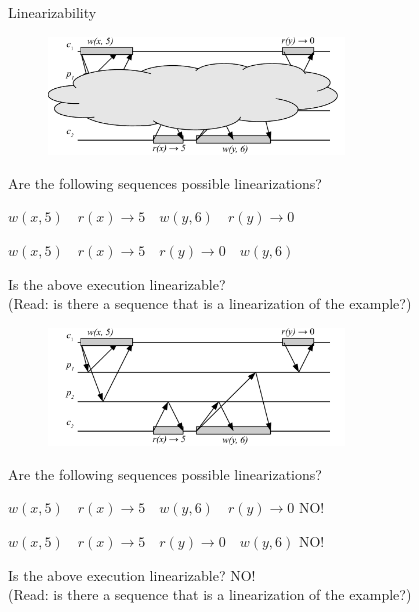 \begin{frame}{Linearizability}

\begin{overprint}

\begin{figure}
\includegraphics[width=0.7\textwidth]{lin-01}
\end{figure}

\begin{example}
\BI
\item Are the following sequences possible linearizations?
\BI
\item $w(x,5) \quad r(x) \rightarrow 5 \quad w(y,6) \quad r(y) \rightarrow 0$
\item $w(x,5) \quad r(x) \rightarrow 5 \quad r(y) \rightarrow 0 \quad w(y,6)$
\EI
\item Is the above execution linearizable?\\ (Read: is there a sequence that is a linearization of the example?)
\EI
\end{example}

\begin{figure}
\includegraphics[width=0.7\textwidth]{lin-01n}
\end{figure}

\begin{example}
\BI
\item Are the following sequences possible linearizations?
\BI
\item $w(x,5) \quad r(x) \rightarrow 5 \quad w(y,6) \quad r(y) \rightarrow 0$    \qquad NO!
\item $w(x,5) \quad r(x) \rightarrow 5 \quad r(y) \rightarrow 0 \quad w(y,6)$    \qquad NO!
\EI
\item Is the above execution linearizable?    \qquad NO! \\ (Read: is there a sequence that is a linearization of the example?) 
\EI
\end{example}

\end{overprint}

\end{frame}

